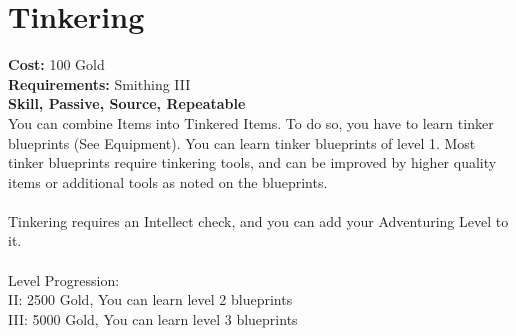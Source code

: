 \section*{Tinkering}
\textbf{Cost:} 100 Gold\\
\textbf{Requirements:} Smithing III\\
\textbf{Skill, Passive, Source, Repeatable}\\
You can combine Items into Tinkered Items. To do so, you have to learn tinker blueprints (See Equipment). You can learn tinker blueprints of level 1. Most tinker blueprints require tinkering tools, and can be improved by higher quality items or additional tools as noted on the blueprints.\\
\\
Tinkering requires an Intellect check, and you can add your Adventuring Level to it.\\
\\
Level Progression:\\
II: 2500 Gold, You can learn level 2 blueprints\\
III: 5000 Gold, You can learn level 3 blueprints\\